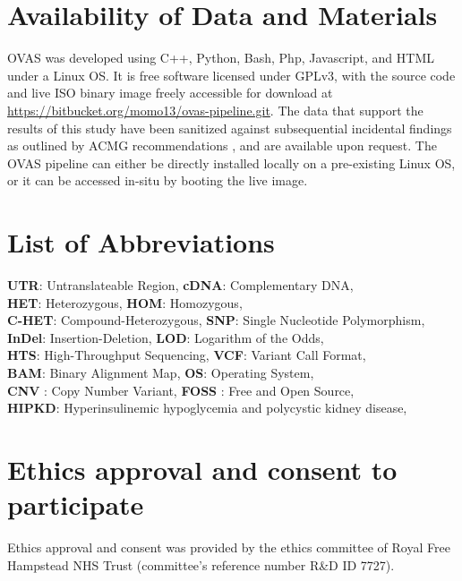 \documentclass[twocolumn]{bmcart}%
\def\app{OVAS}
\begin{document}
\begin{backmatter}

\section*{Availability of Data and Materials}
\app{} was developed using C++, Python, Bash, Php, Javascript, and HTML under a Linux OS. It is free software licensed under GPLv3, with the source code and live ISO binary image freely accessible for download at \url{https://bitbucket.org/momo13/ovas-pipeline.git}. The data that support the results of this study have been sanitized against subsequential incidental findings as outlined by ACMG recommendations \cite{kalia2016recommendations}, and are available upon request. The \app{} pipeline can either be directly installed locally on a pre-existing Linux OS, or it can be accessed in-situ by booting the live image.


\section*{List of Abbreviations}
\textbf{UTR}:  Untranslateable Region, \textbf{cDNA}: Complementary DNA,\\
\textbf{HET}: Heterozygous, \textbf{HOM}: Homozygous,\\
\textbf{C-HET}: Compound-Heterozygous, \textbf{SNP}: Single Nucleotide Polymorphism,\\
\textbf{InDel}: Insertion-Deletion, \textbf{LOD}: Logarithm of the Odds,\\
\textbf{HTS}: High-Throughput Sequencing, \textbf{VCF}: Variant Call Format,\\
\textbf{BAM}: Binary Alignment Map, \textbf{OS}: Operating System,\\
\textbf{CNV} : Copy Number Variant, \textbf{FOSS} : Free and Open Source,\\
\textbf{HIPKD}: Hyperinsulinemic hypoglycemia and polycystic kidney disease,\\




\section*{Ethics approval and consent to participate}
Ethics approval and consent was provided by the ethics committee of Royal Free Hampstead NHS Trust (committee's reference number R\&D ID 7727).


\end{backmatter}
\end{document}
